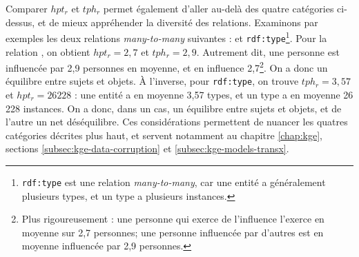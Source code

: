 Comparer $hpt_r$ et $tph_r$ permet également d'aller au-delà des quatre catégories ci-dessus, et de mieux appréhender la diversité des relations. 
Examinons par exemples les deux relations \textit{many-to-many}  suivantes :  et \texttt{rdf:type}\footnote{\texttt{rdf:type} est une relation \textit{many-to-many}, car une entité a généralement plusieurs types, et un type a plusieurs instances.}.
Pour la relation , on obtient $hpt_r = 2,7$ et $tph_r=2,9$. Autrement dit, une personne est influencée par 2,9 personnes en moyenne, et en influence 2,7\footnote{Plus rigoureusement : une personne qui exerce de l'influence l'exerce en moyenne sur 2,7 personnes; une personne influencée par d'autres est en moyenne influencée par 2,9 personnes.}. On a donc un équilibre entre sujets et objets.
À l'inverse, pour \texttt{rdf:type}, on trouve $tph_r = 3,57$ et $hpt_r = 26 228$ : une entité a en moyenne 3,57 types, et un type a en moyenne 26 228 instances.  
On a donc, dans un cas, un équilibre entre sujets et objets, et de l'autre un net déséquilibre. 
Ces considérations permettent de nuancer les quatres catégories décrites plus haut, et servent notamment au chapitre \ref{chap:kge}, sections \ref{subsec:kge-data-corruption} et \ref{subsec:kge-models-transx}.


